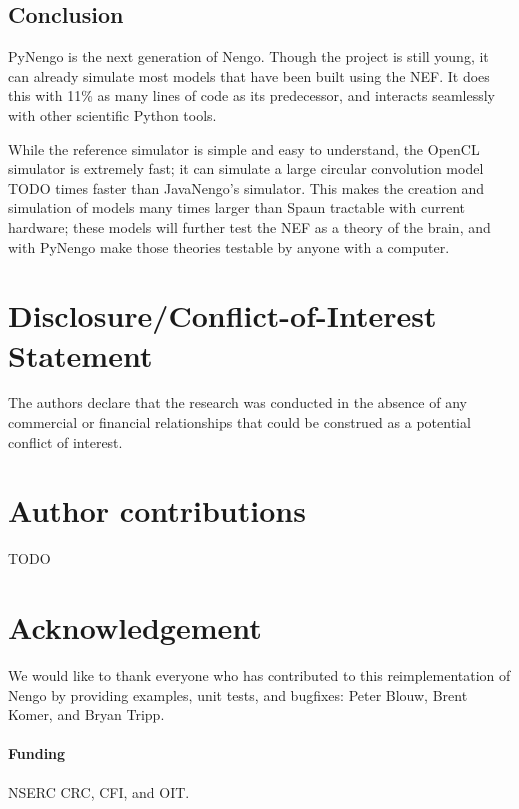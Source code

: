 \documentclass{frontiersSCNS}
\begin{document}
\subsection{Conclusion}

PyNengo is the next generation of Nengo.
Though the project is still young,
it can already simulate most models
that have been built using the NEF.
It does this with 11\% as many lines of code
as its predecessor,
and interacts seamlessly with
other scientific Python tools.

While the reference simulator
is simple and easy to understand,
the OpenCL simulator is extremely fast;
it can simulate a large circular convolution model
TODO times faster than JavaNengo's simulator.
This makes the creation and simulation
of models many times larger than Spaun
tractable with current hardware;
these models will further test
the NEF as a theory of the brain,
and with PyNengo make those theories
testable by anyone with a computer.

\section*{Disclosure/Conflict-of-Interest Statement}

The authors declare that the research was conducted in the absence of
any commercial or financial relationships that could be construed as a
potential conflict of interest.

\section*{Author contributions}

TODO

\section*{Acknowledgement}

We would like to thank
everyone who has contributed
to this reimplementation of Nengo
by providing examples,
unit tests, and bugfixes:
Peter Blouw, Brent Komer, and Bryan Tripp.

\paragraph{Funding\textcolon}
NSERC CRC, CFI, and OIT.



\end{document}
